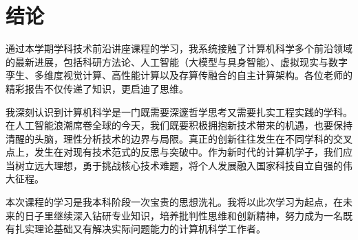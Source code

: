 \chapter{结论}

通过本学期学科技术前沿讲座课程的学习，我系统接触了计算机科学多个前沿领域的最新进展，包括科研方法论、人工智能（大模型与具身智能）、虚拟现实与数字孪生、多维度视觉计算、高性能计算以及存算传融合的自主计算架构。各位老师的精彩报告不仅传递了知识，更启迪了思维。

我深刻认识到计算机科学是一门既需要深邃哲学思考又需要扎实工程实践的学科。在人工智能浪潮席卷全球的今天，我们既要积极拥抱新技术带来的机遇，也要保持清醒的头脑，理性分析技术的边界与局限。真正的创新往往发生在不同学科的交叉点上，发生在对现有技术范式的反思与突破中。作为新时代的计算机学子，我们应当树立远大理想，勇于挑战核心技术难题，将个人发展融入国家科技自立自强的伟大征程。

本次课程的学习是我本科阶段一次宝贵的思想洗礼。我将以此次学习为起点，在未来的日子里继续深入钻研专业知识，培养批判性思维和创新精神，努力成为一名既有扎实理论基础又有解决实际问题能力的计算机科学工作者。